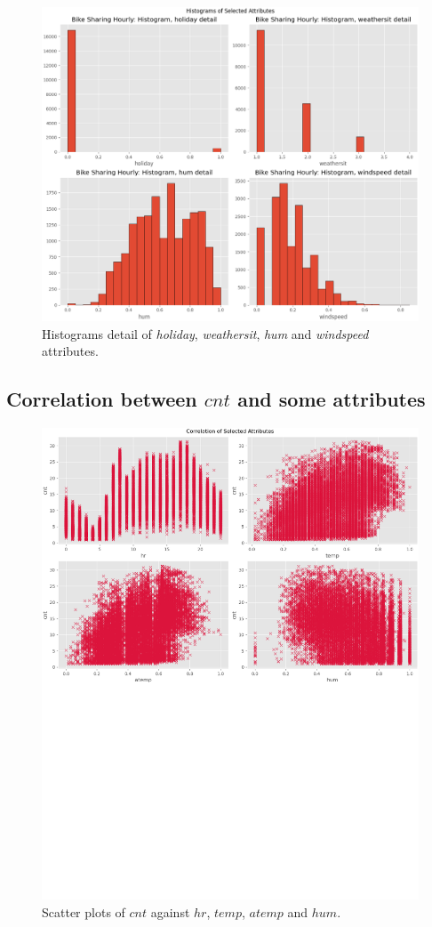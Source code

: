 \documentclass[11pt,a4paper]{article}
\begin{document}
\begin{figure}[H]
    \centering
    \includegraphics[width=1\linewidth]{res/plots/hist_multiple_attributes.png}
    \caption{Histograms detail of \textit{holiday}, \textit{weathersit}, \textit{hum} and \textit{windspeed} attributes.}
    \label{fig:hist_detail}
\end{figure}

\subsection{Correlation between $cnt$ and some attributes}

\begin{figure}[H]
    \centering
    \includegraphics[width=\linewidth]{res/plots/correlation.png}
    \caption{Scatter plots of $cnt$ against $hr$, $temp$, $atemp$ and $hum$.}
    \label{fig:correlation}
\end{figure}
\end{document}
